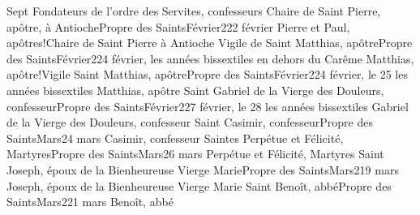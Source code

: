 \documentclass[twoside, french]{book}
\begin{document}
        {}{}{Sept Fondateurs de l’ordre des Servites, confesseurs}{}{}
        {Chaire de Saint Pierre, apôtre, à Antioche}{Propre des Saints}{Février}{2}{22 février}
        {}{}{Pierre et Paul, apôtres!Chaire de Saint Pierre à Antioche}{}{}
        {Vigile de Saint Matthias, apôtre}{Propre des Saints}{Février}{2}{24 février, les années bissextiles en dehors du Carême}
        {}{}{Matthias, apôtre!Vigile}{}{}
        {Saint Matthias, apôtre}{Propre des Saints}{Février}{2}{24 février, le 25 les années bissextiles}
        {}{}{Matthias, apôtre}{}{}
        {Saint Gabriel de la Vierge des Douleurs, confesseur}{Propre des Saints}{Février}{2}{27 février, le 28 les années bissextiles}
        {}{}{Gabriel de la Vierge des Douleurs, confesseur}{}{}
        {Saint Casimir, confesseur}{Propre des Saints}{Mars}{2}{4 mars}
        {}{}{Casimir, confesseur}{}{}
        {Saintes Perpétue et Félicité, Martyres}{Propre des Saints}{Mars}{2}{6 mars}
        {}{}{Perpétue et Félicité, Martyres}{}{}
        {Saint Joseph, époux de la Bienheureuse Vierge Marie}{Propre des Saints}{Mars}{2}{19 mars}
        {}{}{Joseph, époux de la Bienheureuse Vierge Marie}{}{}
        {Saint Benoît, abbé}{Propre des Saints}{Mars}{2}{21 mars}
        {}{}{Benoît, abbé}{}{}
\end{document}
